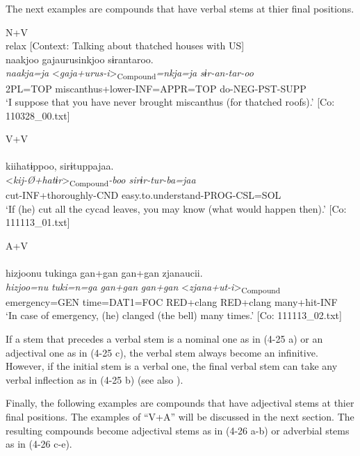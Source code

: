 The next examples are compounds that have verbal stems at thier final positions.

\ea \label{ex:4.25} \ea  N+V \label{ex:4.25a}\\relax
    [Context: Talking about thatched houses with US]\\
\glll   naakjoo  gajaurusinkjoo  sɨrantaroo.\\
      \textit{naakja=ja}  <\textit{gaja+urus-i}>\textsubscript{Compound}\textit{=nkja=ja}  \textit{sɨr-an-tar-oo}\\
      2PL=TOP  miscanthus+lower-INF=APPR=TOP  do-NEG-PST-SUPP\\
      \glt       ‘I suppose that you have never brought miscanthus (for thatched roofs).’ [Co: 110328\_00.txt]

\ex  V+V\\\\
\glll     kiihatɨppoo,  sirɨtuppajaa.\\
      <\textit{kij-Ø+hatɨr}>\textsubscript{Compound}\textit{{}-boo  sirɨr-tur-ba=jaa}\\
      cut-INF+thoroughly-CND  easy.to.understand-PROG-CSL=SOL\\
    \glt       ‘If (he) cut all the cycad leaves, you may know (what would happen then).’ [Co: 111113\_01.txt]

\ex A+V\\\\
\glll    {\textbar}hizjoo{\textbar}nu  tukinga  gan+gan  gan+gan    zjanaucii.\\
      \textit{hizjoo=nu}  \textit{tuki=n=ga}  \textit{gan+gan}  \textit{gan+gan}   <\textit{zjana+ut-i}>\textsubscript{Compound}\\
      emergency=GEN  time=DAT1=FOC  RED+clang  RED+clang     many+hit-INF    \\
    \glt       ‘In case of emergency, (he) clanged (the bell) many times.’ [Co: 111113\_02.txt]
    \z
\z

If a stem that precedes a verbal stem is a nominal one as in (4-25 a) or an adjectival one as in (4-25 c), the verbal stem always become an infinitive. However, if the initial stem is a verbal one, the final verbal stem can take any verbal inflection as in (4-25 b) (see also ).

  Finally, the following examples are compounds that have adjectival stems at thier final positions. The examples of “V+A” will be discussed in the next section. The resulting compounds become adjectival stems as in (4-26 a-b) or adverbial stems as in (4-26 c-e).

